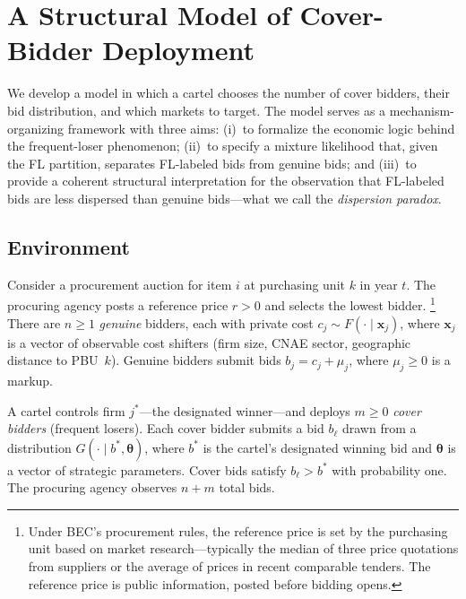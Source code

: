 
\section{A Structural Model of Cover-Bidder Deployment}
\label{sec:structural}

We develop a model in which a cartel chooses the number of cover
bidders, their bid distribution, and which markets to target. The
model serves as a mechanism-organizing framework with three aims:
(i)~to formalize the economic logic behind the frequent-loser
phenomenon; (ii)~to specify a mixture likelihood that, given the FL
partition, separates FL-labeled bids from genuine bids; and
(iii)~to provide a coherent structural interpretation for the
observation that FL-labeled bids are less dispersed than genuine
bids---what we call the \emph{dispersion paradox}.


\subsection{Environment}
\label{sec:environment}

Consider a procurement auction for item $i$ at purchasing unit $k$ in
year $t$. The procuring agency posts a reference price $r > 0$ and
selects the lowest bidder.%
\footnote{Under BEC's procurement rules, the reference price is
set by the purchasing unit based on market research---typically
the median of three price quotations from suppliers or the
average of prices in recent comparable tenders. The reference
price is public information, posted before bidding opens.}
There are $n \geq 1$ \emph{genuine} bidders,
each with private cost $c_j \sim F(\cdot \mid \mathbf{x}_j)$, where
$\mathbf{x}_j$ is a vector of observable cost shifters (firm size, CNAE
sector, geographic distance to PBU~$k$). Genuine bidders submit bids
$b_j = c_j + \mu_j$, where $\mu_j \geq 0$ is a markup.

A cartel controls firm $j^*$---the designated winner---and deploys
$m \geq 0$ \emph{cover bidders} (frequent losers). Each cover bidder
submits a bid $b_\ell$ drawn from a distribution $G(\cdot \mid b^*,
\boldsymbol{\theta})$, where $b^*$ is the cartel's designated winning
bid and $\boldsymbol{\theta}$ is a vector of strategic parameters. Cover
bids satisfy $b_\ell > b^*$ with probability
one. The procuring agency observes $n + m$ total bids.


